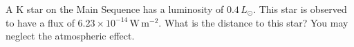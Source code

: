 A K star on the Main Sequence has a luminosity of $0.4\,L_\odot$. This star
is observed to have a flux of $6.23 \times 10^{-14}\,\mathrm{W\,m^{-2}}$.
What is the distance to this star? You may neglect the atmospheric effect.
